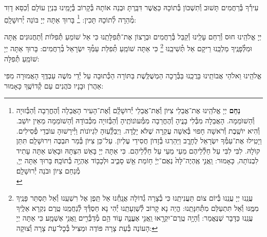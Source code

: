 \documentclass[twoside, openany, parskip=half, 11pt]{book}
\begin{document}
עִירְ֯ךָ בְּ֯רַחֲמִים תָּשׁוּב וְ֯תִשְׁכּוֹן בְּ֯תוֹכָהּ כַּאֲשֶׁר דִּבַּֽרְתָּ וּבְנֵה אוֹתָהּ בְּ֯קָרוֹב בְּ֯יָמֵֽינוּ בִּנְיַן עוֹלָם וְ֯כִסֵּא דָוִד מְ֯הֵרָה לְ֯תוֹכָהּ תָּכִין:
\footnote{
\textbf{נַחֵם}
יְיָ אֱלֹהֵֽינוּ אֶת־אֲבֵלֵי צִיּוֺן וְ֯אֶת־אֲבֵלֵי יְ֯רוּשָׁלַֽ֔֗͏ִם וְ֯אֶת־הָעִיר הָאֲבֵלָה וְ֯הֶחֳרֵבָה וְ֯הַבְּ֯זוּיָה וְ֯הַשׁוֺמֵמָה. הָאֲבֵלָה מִבְּ֯לִי בָנֱיהָ וְ֯הֶחֳרֵבָה מִמְּ֯עוֺנוֺתֶֽיהָ וְ֯הַבְּ֯זוּיָה מִכְּ֯בוֺדָהּ וְ֯הַשׁוֺמֵמָה מֵאֵין יוֺשֵׁב. וְ֯הִיא יוֺשֶֽׁבֶת וְ֯רֹאשָׁה חָפוּי בְּ֯אִשָׁה עֲקַרָה שֶׁלֹּא יָלֳדָה. וַיְבַלְְּ֯עֽוּהָ לִגְיוֺנוֺת וַיְּ֯ירָשׁוּהָ עוֺבְדֵי פְ֯סִילִים. וַיָטִֽילוּ אֶת־עַמְּ֯ךָ יִשְׂרָאֵל לֶחָרֱֽב וַיַּהַרְגוּ בְ֯זָדוֺן חֲסִידֵי עֶלְיוֺן. עַל־כֵּן צִיּוֺן בְּ֯מַר תּבְכֶּה וִירוּשָׁלַֽ͏ִם תִּתֵּן קוֺלָהּ. לִבִּי לִבִּי עַל חַלְ֯לֵיהֶם מֵעַי מֵעַי עַל חַלְ֯לֵיהֶם. כִּי אַתָּה יְיָ בָּאֵשׁ הִצַּתָּהּ וּבָאֵשׁ אַתָּה עָתִיד לִבְנוֺתָה, כָּאָמוּר: וַֽאֲנִ֤י אֶֽהְיֶה־לָּהּ֙ נְאֻם־יְיָ֔ ח֥וֹמַת אֵ֖שׁ סָבִ֑יב וּלְכָב֖וֹד אֶהְיֶ֥ה בְ֯תוֹכָֽהּ׃
בָּרוּךְ אַתָּה יְיָ, מְ֯נַחֵם צִיוֺן וּבֹנֵה יְ֯רוּשָׁלַֽ͏ִם׃ \\
}
בָּרוּךְ אַתָּה יְיָ בּוֹנֵה יְ֯רוּשָׁלָֽםִ:

\weekdaysamalchus

יְיָ אֱלֹהֵֽינוּ חוּס וְ֯רַחֵם עָלֵֽינוּ וְ֯קַבֵּל בְּ֯רַחֲמִים וּבְרָצוֹן אֶת־תְּ֯פִלָּתֵֽנוּ כִּי אֵל שׁוֹמֵעַ תְּ֯פִלּוֹת וְ֯תַחֲנוּנִים אַֽתָּה וּמִלְּ֯פָנֶֽיךָ מַלְכֵּֽנוּ רֵיקָם אַל תְּ֯שִׁיבֵֽנוּ
\footnote{
עֲנֵֽנוּ יְיָ עֲנֵֽנוּ בְּ֯יוֹם צוֹם תַּעֲנִיתֵֽנוּ כִּי בְ֯צָרָה גְ֯דוֹלָה אֲנָֽחְ֯נוּ אַל תֵּֽפֶן אֶל רִשְׁעֵֽנוּ וְ֯אַל תַּסְתֵּר פָּנֶֽיךָ מִמֶּֽנּוּ וְ֯אַל תִּתְעַלַּם מִתְּ֯חִנָּתֵֽנוּ: הֱיֵה נָא קָרוֹב לְ֯שַׁוְעָתֵֽנוּ יְ֯הִי נָא חַסְדְּ֯ךָ לְ֯נַחֲמֵֽנוּ טֶֽרֶם נִקְרָא אֵלֶֽיךָ עֲנֵֽנוּ כַּדָּבָר שֶׁנֶּאֱמַר:
וְ֯הָיָ֥ה טֶֽרֶם־יִקְרָ֖אוּ וַֽאֲנִ֣י אֶעֱנֶ֑ה ע֛וֹד הֵ֥ם מְ֯דַבְּ֯רִ֖ים וַֽאֲנִ֥י אֶשְׁמָֽע׃ כִּי אַתָּה יְיָ הָעוֹנֶה בְּ֯עֵת צָרָה פּוֹדֶה וּמַצִּיל בְּ֯כׇל־עֵת צָרָה וְ֯צוּקָה:
}
כִּי אַתָּה שׁוֹמֵֽעַ תְּ֯פִלַּת עַמְּ֯ךָ יִשְׂרָאֵל בְּ֯רַחֲמִים: בָּרוּךְ אַתָּה יְיָ שׁוֹמֵֽעַ תְּ֯פִלָּה:

\retzeh

\yaalehveyavo

\zion

\modim

\alhanisim

\weekdaysahodos

אֱלֹהֵֽינוּ וֵאלֹהֵי אֲבוֹתֵֽינוּ בָּרֲכֵֽנוּ בַּבְּ֯רָכָה הַמְשֻׁלֶּֽשֶׁת בַּתּוֹרָה
הַכְּ֯תוּבָה עַל יְ֯דֵי מֹשֶׁה עַבְדֶּֽךָ הָאֲמוּרָה מִפִּי אַהֲרֹן וּבָנָיו כֹּהֲנִים עַם קְ֯דוֹשֶֽׁךָ כָּאָמוּר:
\end{document}
